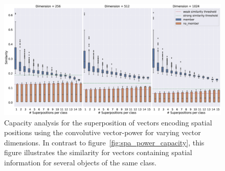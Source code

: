 \begin{figure}[t]
    \centering
    \includegraphics[width=0.95\linewidth]{imgs/spa_power_capacity_superpositions_per_class.eps}
    \caption{Capacity analysis for the superposition of vectors encoding spatial positions using the convolutive vector-power for varying vector dimensions.
        In contrast to figure~\ref{fig:spa_power_capacity}, this figure illustrates the similarity for vectors containing spatial information for several objects of the same class.
    }
    \label{fig:spa_power_capacity_superpositions_per_class}
\end{figure}

